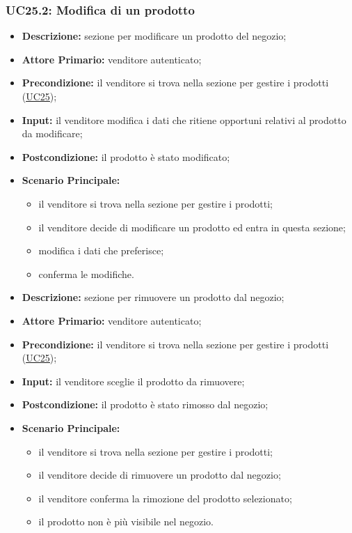 \subsubsection{UC25.2: Modifica di un prodotto}
\label{sec:UC25.2}
\begin{itemize}
    \item \textbf{Descrizione:} sezione per modificare un prodotto del negozio;
    \item \textbf{Attore Primario:} venditore autenticato;
    \item \textbf{Precondizione:} il venditore si trova nella sezione per gestire i prodotti (\hyperref[sec:UC25]{\underline{UC25}});
    \item \textbf{Input:} il venditore modifica i dati che ritiene opportuni relativi al prodotto da modificare;
    \item \textbf{Postcondizione:} il prodotto è stato modificato;
    \item \textbf{Scenario Principale:}
          \begin{itemize}
              \item il venditore si trova nella sezione per gestire i prodotti;
              \item il venditore decide di modificare un prodotto ed entra in questa sezione;
              \item modifica i dati che preferisce;
              \item conferma le modifiche.
          \end{itemize}
\end{itemize}
\label{sec:UC25.3}
\begin{itemize}
    \item \textbf{Descrizione:} sezione per rimuovere un prodotto dal negozio;
    \item \textbf{Attore Primario:} venditore autenticato;
    \item \textbf{Precondizione:} il venditore si trova nella sezione per gestire i prodotti (\hyperref[sec:UC25]{\underline{UC25}});
    \item \textbf{Input:} il venditore sceglie il prodotto da rimuovere;
    \item \textbf{Postcondizione:} il prodotto è stato rimosso dal negozio;
    \item \textbf{Scenario Principale:}
          \begin{itemize}
              \item il venditore si trova nella sezione per gestire i prodotti;
              \item il venditore decide di rimuovere un prodotto dal negozio;
              \item il venditore conferma la rimozione del prodotto selezionato;
              \item il prodotto non è più visibile nel negozio.
          \end{itemize}
\end{itemize}